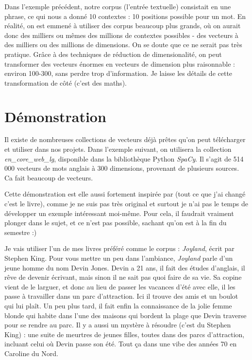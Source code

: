 \documentclass[11pt, a4paper]{report}
\begin{document}
Dans l'exemple précédent, notre corpus (l'entrée textuelle) consistait en une phrase, ce qui 
nous a donné 10 contextes : 10 positions possible pour un mot.  
En réalité, on est emmené à utiliser des corpus beaucoup plus grands, où on aurait donc des 
milliers ou mêmes des millions de contextes possibles - des vecteurs à des milliers ou des 
millions de dimensions. On se doute que ce ne serait pas très 
pratique. Grâce à des techniques de réduction de dimensionalité, on peut transformer des vecteurs 
énormes en vecteurs de dimension plus raisonnable : environ 100-300, sans perdre trop 
d'information. Je laisse les détails de cette 
transformation de côté (c'est des maths).

\section{Démonstration}
Il existe de nombreuses collections de vecteurs déjà prêtes qu'on 
peut télécharger et utiliser dans nos projets. Dans l'exemple suivant, 
on utilisera la collection \textit{en\_core\_web\_lg}, disponible dans la bibliothèque Python 
\textit{SpaCy}. Il s'agit de 514 000 vecteurs de mots 
anglais à 300 dimensions, provenant de plusieurs sources. 
Ca fait beaucoup de vecteurs. 

Cette démonstration est elle aussi fortement inspirée par
\cite[\textit{Understanding word vectors}, Allison PARISH]{understanding-word-vectors} (tout ce que j'ai changé c'est le livre),
comme je ne suis pas très original et surtout je n'ai pas le temps de développer un exemple intéressant 
moi-même. Pour cela, il faudrait vraiment plonger dans le sujet, et ce n'est pas 
possible, sachant qu'on est à la fin du semestre :)

Je vais utiliser l'un de mes livres préféré comme le corpus : 
\textit{Joyland}, écrit par Stephen King. Pour vous mettre un peu dans l'ambiance, 
\textit{Joyland} parle d'un jeune homme du nom Devin Jones. Devin a 21 ans, il fait 
des études d'anglais, il rêve de devenir écrivant, mais sinon il ne sait pas 
quoi faire de sa vie. Sa copine vient de le larguer, et donc au lieu de 
passer les vacances d'été avec elle, il les passe à travailler dans un parc 
d'attraction. Ici il trouve des amis et un boulot qui lui plaît. Un peu plus tard, 
il fait enfin la connaissance de la jolie femme blonde qui habite dans l'une des maisons 
qui bordent la plage que Devin traverse pour se rendre au parc. Il y a aussi 
un mystère à résoudre (c'est du Stephen King) : une suite de meurtres de jeunes 
filles, toutes dans des parcs d'attraction, incluant celui où Devin passe son été. 
Tout ça dans une vibe des années 70 en Caroline du Nord. 
\end{document}
